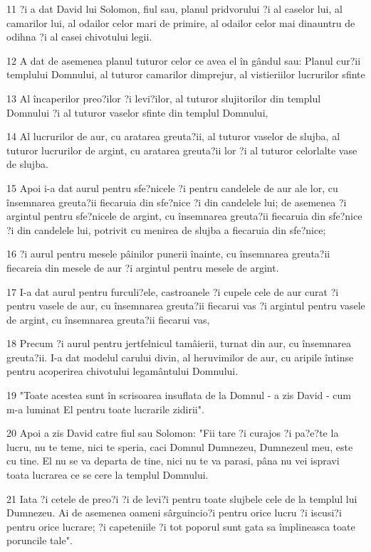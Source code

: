 \par 11 ?i a dat David lui Solomon, fiul sau, planul pridvorului ?i al caselor lui, al camarilor lui, al odailor celor mari de primire, al odailor celor mai dinauntru de odihna ?i al casei chivotului legii.
\par 12 A dat de asemenea planul tuturor celor ce avea el în gândul sau: Planul cur?ii templului Domnului, al tuturor camarilor dimprejur, al vistieriilor lucrurilor sfinte
\par 13 Al încaperilor preo?ilor ?i levi?ilor, al tuturor slujitorilor din templul Domnului ?i al tuturor vaselor sfinte din templul Domnului,
\par 14 Al lucrurilor de aur, cu aratarea greuta?ii, al tuturor vaselor de slujba, al tuturor lucrurilor de argint, cu aratarea greuta?ii lor ?i al tuturor celorlalte vase de slujba.
\par 15 Apoi i-a dat aurul pentru sfe?nicele ?i pentru candelele de aur ale lor, cu însemnarea greuta?ii fiecaruia din sfe?nice ?i din candelele lui; de asemenea ?i argintul pentru sfe?nicele de argint, cu însemnarea greuta?ii fiecaruia din sfe?nice ?i din candelele lui, potrivit cu menirea de slujba a fiecaruia din sfe?nice;
\par 16 ?i aurul pentru mesele pâinilor punerii înainte, cu însemnarea greuta?ii fiecareia din mesele de aur ?i argintul pentru mesele de argint.
\par 17 I-a dat aurul pentru furculi?ele, castroanele ?i cupele cele de aur curat ?i pentru vasele de aur, cu însemnarea greuta?ii fiecarui vas ?i argintul pentru vasele de argint, cu însemnarea greuta?ii fiecarui vas,
\par 18 Precum ?i aurul pentru jertfelnicul tamâierii, turnat din aur, cu însemnarea greuta?ii. I-a dat modelul carului divin, al heruvimilor de aur, cu aripile întinse pentru acoperirea chivotului legamântului Domnului.
\par 19 "Toate acestea sunt în scrisoarea insuflata de la Domnul - a zis David - cum m-a luminat El pentru toate lucrarile zidirii".
\par 20 Apoi a zis David catre fiul sau Solomon: "Fii tare ?i curajos ?i pa?e?te la lucru, nu te teme, nici te speria, caci Domnul Dumnezeu, Dumnezeul meu, este cu tine. El nu se va departa de tine, nici nu te va parasi, pâna nu vei ispravi toata lucrarea ce se cere la templul Domnului.
\par 21 Iata ?i cetele de preo?i ?i de levi?i pentru toate slujbele cele de la templul lui Dumnezeu. Ai de asemenea oameni sârguincio?i pentru orice lucru ?i iscusi?i pentru orice lucrare; ?i capeteniile ?i tot poporul sunt gata sa împlineasca toate poruncile tale".

